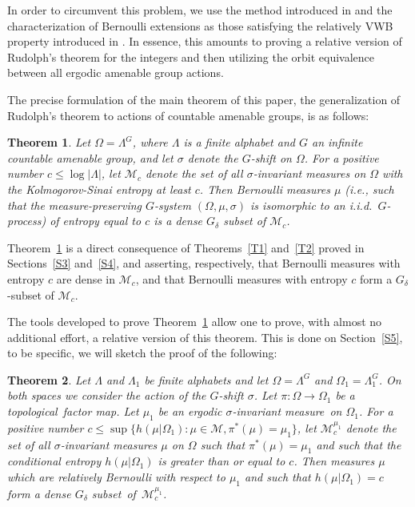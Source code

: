 \documentclass{amsart}
\newtheorem{thm}{Theorem}[section]
\theoremstyle{remark}
\def \M {\mathcal M}
\def \tl {topological}
\def \im {invariant measure}
\begin{document}
In order to circumvent this problem, we use the  method introduced in \cite{9a} and the characterization of Bernoulli extensions as those satisfying the 
relatively VWB property introduced in \cite{11a}. In essence, this amounts to proving a relative version of Rudolph's theorem for the integers and then utilizing the orbit equivalence between all ergodic amenable group actions.      

The precise formulation of the main theorem of this paper, the generalization of Rudolph's theorem to actions of countable amenable groups, is as follows:

\begin{thm}\label{Ru}
Let $\Omega=\Lambda^G$, where $\Lambda$ is a finite alphabet and $G$ an infinite countable amenable group, and let $\sigma$ denote the $G$-shift on $\Omega$. For a positive number $c\le\log|\Lambda|$, let $\M_c$ denote the set of all $\sigma$-\im s on $\Omega$ with the Kolmogorov-Sinai entropy at least $c$. Then Bernoulli measures $\mu$ (i.e., such that the measure-preserving $G$-system $(\Omega,\mu,\sigma)$ is isomorphic to an i.i.d.\ $G$-process) of entropy equal to $c$ is a dense $G_\delta$ subset of $\M_c$.
\end{thm}
Theorem~\ref{Ru} is a direct consequence of Theorems~\ref{T1} and~\ref{T2} proved in Sections~\ref{S3} and~\ref{S4}, and asserting, respectively, that Bernoulli measures with entropy $c$ are dense in $\M_c$, and that Bernoulli measures with entropy $c$ form a $G_\delta$-subset of $\M_c$. 
\medskip

The tools developed to prove Theorem~\ref{Ru} allow one to prove, with almost no additional effort, a relative version of this theorem.
This is done on Section~\ref{S5}, to be specific, we will sketch the proof of the following:
\begin{thm}\label{Ru1}
Let $\Lambda$ and $\Lambda_1$ be finite alphabets and let $\Omega=\Lambda^G$ and $\Omega_1=\Lambda_1^G$. On both spaces we consider the action of the $G$-shift $\sigma$. Let $\pi:\Omega\to\Omega_1$ be a \tl\ factor map. Let $\mu_1$ be an ergodic $\sigma$-\im\ on $\Omega_1$. For a positive number $c\le\sup\{h(\mu|\Omega_1):\mu\in\M, \pi^*(\mu)=\mu_1\}$, let $\M^{\mu_1}_c$ denote the set of all $\sigma$-\im s $\mu$ on $\Omega$ such that $\pi^*(\mu)=\mu_1$ and such that the conditional entropy $h(\mu|\Omega_1)$ is greater than or equal to $c$. Then measures $\mu$ which are relatively Bernoulli with respect to $\mu_1$ and such that $h(\mu|\Omega_1)=c$ form a dense $G_\delta$ subset~of~$\M^{\mu_1}_c$.
\end{thm}
\end{document}
